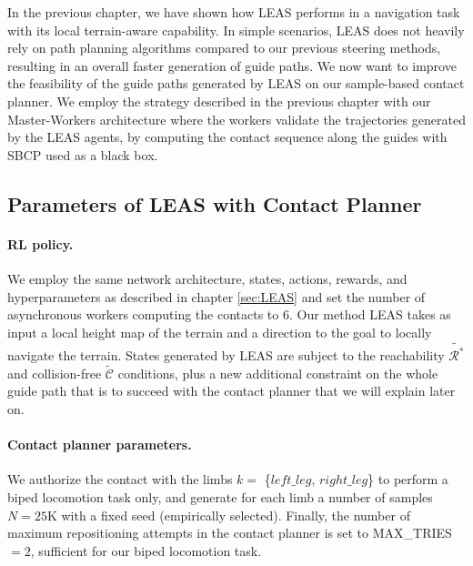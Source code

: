 In the previous chapter, we have shown how LEAS performs in a navigation task with its local terrain-aware capability.
In simple scenarios, LEAS does not heavily rely on path planning algorithms compared to our previous steering methods, resulting in an overall faster generation of guide paths.
We now want to improve the feasibility of the guide paths generated by LEAS on our sample-based contact planner.
We employ the strategy described in the previous chapter with our Master-Workers architecture where the workers validate the trajectories generated by the LEAS agents, by computing the contact sequence along the guides with SBCP used as a black box.

\subsection{Parameters of LEAS with Contact Planner}
\paragraph{RL policy.}
We employ the same network architecture, states, actions, rewards, and hyperparameters as described in chapter \ref{sec:LEAS} and set the number of asynchronous workers computing the contacts to 6.
Our method LEAS takes as input a local height map of the terrain and a direction to the goal to locally navigate the terrain. 
States generated by LEAS are subject to the reachability $\tilde{\mathcal{R}^*}$ and collision-free $\tilde{\mathcal{C}}$ conditions, plus a new additional constraint on the whole guide path that is to succeed with the contact planner that we will explain later on.

\paragraph{Contact planner parameters.}
We authorize the contact with the limbs $k=$ \{$left\_leg$, $right\_leg$\} to perform a biped locomotion task only, and generate for each limb a number of samples $N=25$K with a fixed seed (empirically selected). Finally, the number of maximum repositioning attempts in the contact planner is set to MAX\_TRIES $=2$, sufficient for our biped locomotion task.

